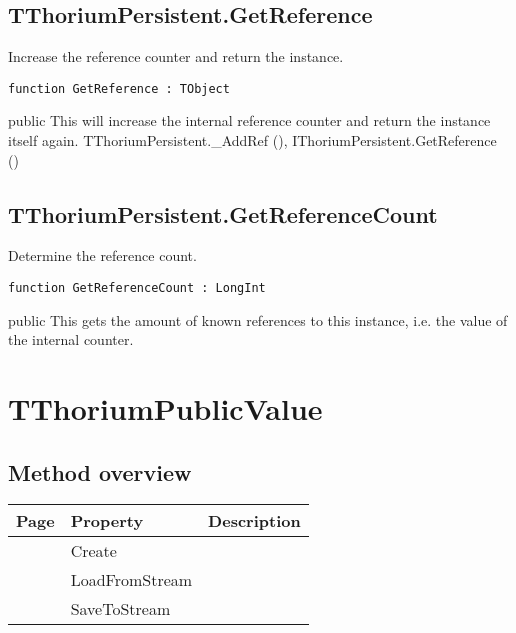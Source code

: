 \subsection{TThoriumPersistent.GetReference}
\label{thoriumcore:thorium:tthoriumpersistent:getreference}
\begin{FPCList}
\Synopsis
Increase the reference counter and return the instance.\Declaration 

\begin{verbatim}
function GetReference : TObject
\end{verbatim}
\Visibility
public
\Description
This will increase the internal reference counter and return the instance itself again. \Errors
\SeeAlso
TThoriumPersistent.\_AddRef (\pageref{thoriumcore:thorium:tthoriumpersistent:addref}),
IThoriumPersistent.GetReference (\pageref{thoriumcore:thorium:ithoriumpersistent:getreference})\end{FPCList}
\subsection{TThoriumPersistent.GetReferenceCount}
\label{thoriumcore:thorium:tthoriumpersistent:getreferencecount}
\begin{FPCList}
\Synopsis
Determine the reference count.\Declaration 

\begin{verbatim}
function GetReferenceCount : LongInt
\end{verbatim}
\Visibility
public
\Description
This gets the amount of known references to this instance, i.e. the value of the internal counter. \Errors
\end{FPCList}
\section{TThoriumPublicValue}
\label{thoriumcore:thorium:tthoriumpublicvalue}
\subsection{Method overview}
\label{thoriumcore:thorium:tthoriumpublicvalue:methods}
\begin{tabularx}{\textwidth}{llX}
Page & Property & Description  \\ \hline
\pageref{thoriumcore:thorium:tthoriumpublicvalue:create} & Create  &  \\
\pageref{thoriumcore:thorium:tthoriumpublicvalue:loadfromstream} & LoadFromStream  &  \\
\pageref{thoriumcore:thorium:tthoriumpublicvalue:savetostream} & SaveToStream  &  \\
\hline
\end{tabularx}

